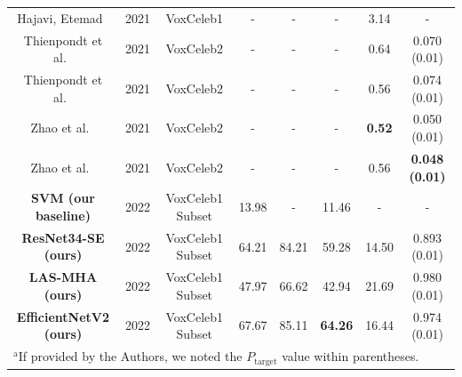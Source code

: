 \documentclass[conference]{IEEEtran}
\begin{document}
\begin{table}[htbp]
\begin{center}
\begin{tabular}{|c|c|c|c|c|c|c|c|}
        Hajavi, Etemad~\cite{hajavi2021siamese} & 2021 & VoxCeleb1 & - & - & - & 3.14 & - \\
        Thienpondt et al.~\cite{thienpondt2021voxsrc} & 2021 & VoxCeleb2 & - & - & - & 0.64 & 0.070 (0.01) \\
        Thienpondt et al.~\cite{thienpondt2021voxsrc} & 2021 & VoxCeleb2 & - & - & - & 0.56 & 0.074 (0.01) \\
        Zhao et al.~\cite{zhao2021speakin} & 2021 & VoxCeleb2 & - & - & - & \textbf{0.52} & 0.050 (0.01) \\
        Zhao et al.~\cite{zhao2021speakin} & 2021 & VoxCeleb2 & - & - & - & 0.56 & \textbf{0.048 (0.01)} \\
        \hline
        \textbf{SVM (our baseline)} & 2022 & VoxCeleb1 Subset & 13.98 & - & 11.46 & - & - \\
        \textbf{ResNet34-SE (ours)} & 2022 & VoxCeleb1 Subset & 64.21 & 84.21 & 59.28 & 14.50 & 0.893 (0.01) \\
        \textbf{LAS-MHA (ours)} & 2022 & VoxCeleb1 Subset & 47.97 & 66.62 & 42.94 & 21.69 & 0.980 (0.01) \\
        \textbf{EfficientNetV2 (ours)} & 2022 & VoxCeleb1 Subset & 67.67 & 85.11 & \textbf{64.26} & 16.44 & 0.974 (0.01) \\
        \hline
        \multicolumn{8}{l}{$^{\mathrm{a}}$If provided by the Authors, we noted the $P_{\text{target}}$ value within parentheses.} \\
        \end{tabular}
        \label{tab:results}
    \end{center}
\end{table}
\end{document}
